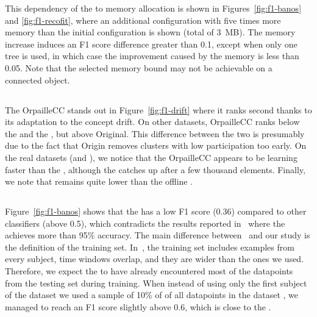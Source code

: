 This dependency of the \mondrianforest to memory allocation is shown in
Figures~\ref{fig:f1-banos} and \ref{fig:f1-recofit}, where an additional
configuration with five times more memory than the initial configuration is
shown (total of 3~MB).  The memory increase induces an F1 score difference
greater than 0.1, except when only one tree is used, in
which case the improvement caused by the memory is less than 0.05. Note that the
selected memory bound may not be achievable on a connected object.

\subsection{\mcnn}

The \mcnn OrpailleCC stands out in Figure~\ref{fig:f1-drift}  where it ranks second thanks
to its adaptation to the concept drift.  On other datasets, \mcnn OrpailleCC
ranks below the \mondrianforest and the \hoeffdingtree, but above \mcnn
Original. This difference between the two \mcnns is presumably due to the fact
that \mcnn Origin removes clusters with low participation too early.  On the real datasets (\banosdataset and \recofitdataset), we notice
that the \mcnn OrpailleCC appears to be learning faster than the
\mondrianforest, although the \mondrianforest catches up after a few thousand
elements. Finally, we note that \mcnn remains quite lower than the offline \knn.

\subsection{\FNN}

Figure~\ref{fig:f1-banos} shows that the \FNN has a low F1 score (0.36)
compared to other classifiers (above 0.5), which contradicts the results reported
in~\cite{omid_2019} where the \FNN achieves more than 95\% accuracy. The main
difference between~\cite{omid_2019} and our study is the definition of the training set.
In~\cite{omid_2019}, the training set includes examples from every
subject, time windows overlap, and they are wider than the ones we used.
Therefore, we expect the \FNN to have already encountered most of the datapoints
from the testing set during training. When instead of using only the first subject of the
\banosdataset dataset we used a sample of 10\% of of all datapoints in the
\banosdataset dataset , we managed to reach an F1 score slightly above 0.6, which
is close to the \naivebayes.

